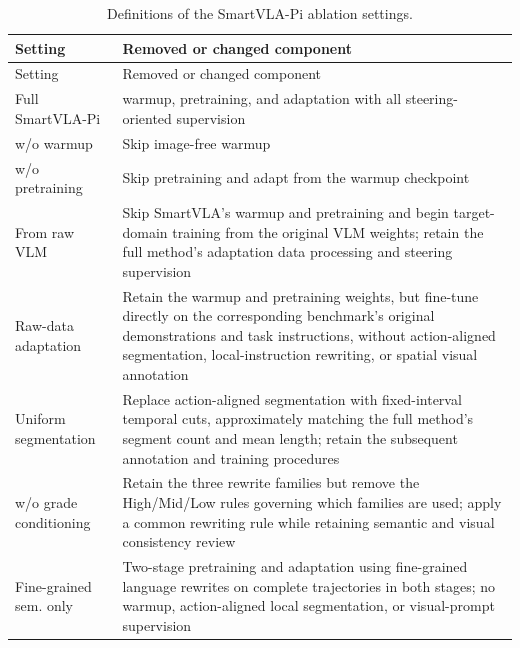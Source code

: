 \begingroup
\normalsize
\setlength{\tabcolsep}{4pt}
\setlength{\LTcapwidth}{\linewidth}
\setlength{\LTpre}{\baselineskip}
\setlength{\LTpost}{\baselineskip}
\renewcommand{\arraystretch}{1.10}
\begin{longtable}{@{}
  >{\raggedright\arraybackslash}p{}
  >{\raggedright\arraybackslash}p{}@{}}
\caption{Definitions of the SmartVLA-Pi ablation settings.}\label{tab:ablation-settings}\\
\toprule
Setting & Removed or changed component \\
\midrule
\endfirsthead
\toprule
Setting & Removed or changed component \\
\midrule
\endhead
\bottomrule
\endfoot
\bottomrule
\endlastfoot
Full SmartVLA-Pi & warmup, pretraining, and adaptation with all steering-oriented supervision \\
\midrule
w/o warmup & Skip image-free warmup \\
\midrule
w/o pretraining & Skip pretraining and adapt from the warmup checkpoint \\
\midrule
From raw VLM & Skip SmartVLA's warmup and pretraining and begin target-domain training from the original VLM weights; retain the full method's adaptation data processing and steering supervision \\
\midrule
Raw-data adaptation & Retain the warmup and pretraining weights, but fine-tune directly on the corresponding benchmark's original demonstrations and task instructions, without action-aligned segmentation, local-instruction rewriting, or spatial visual annotation \\
\midrule
Uniform segmentation & Replace action-aligned segmentation with fixed-interval temporal cuts, approximately matching the full method's segment count and mean length; retain the subsequent annotation and training procedures \\
\midrule
w/o grade conditioning & Retain the three rewrite families but remove the High/Mid/Low rules governing which families are used; apply a common rewriting rule while retaining semantic and visual consistency review \\
\midrule
Fine-grained sem. only & Two-stage pretraining and adaptation using fine-grained language rewrites on complete trajectories in both stages; no warmup, action-aligned local segmentation, or visual-prompt supervision \\
\end{longtable}
\endgroup
